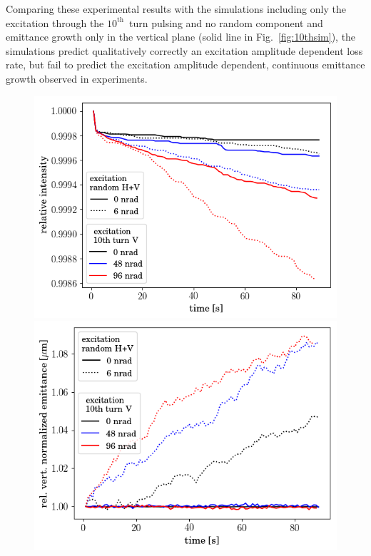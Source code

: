 \documentclass[%
 reprint,
 amsmath,amssymb,
 aps,
prstab,
]{revtex4-1}
\begin{document}
Comparing these experimental results with the simulations including only the excitation through the $10^{\mathrm{th}}$~turn pulsing and no random component and emittance growth only in the vertical plane (solid line in Fig.~\ref{fig:10thsim}), the simulations predict qualitatively correctly an excitation amplitude dependent loss rate, but fail to predict the excitation amplitude dependent, continuous emittance growth observed in experiments.
\begin{figure}[h]
	\begin{minipage}[t]{0.49\linewidth}
		\centering
		\includegraphics[width=1.0\linewidth]{2016injerra2b2uran1_2e-3_10thV_3_5um_intensity.png}
	\end{minipage}
	\begin{minipage}[t]{0.49\linewidth}
		\centering
		\includegraphics[width=1.0\linewidth]{2016injerra2b2uran1_2e-3_10thV_3_5um_emit2_rel.png}

\end{minipage}
\end{figure}
\end{document}
